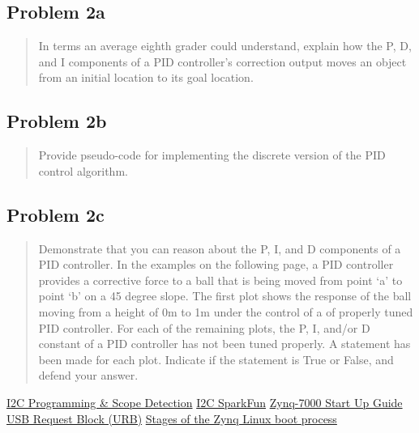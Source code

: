 \documentclass[10pt,a4paper]{article}
\let\oldsubsection\subsection
\renewcommand{\subsection}{%
    \setcounter{equation}{0}%
    \oldsubsection%
}
\begin{document}
\subsection{Problem 2a}\begin{quote}
In terms an average eighth grader could understand, explain how the P, D, and I components of a PID
controller’s correction output moves an object from an initial location to its goal location.\\
\end{quote}



\subsection{Problem 2b}\begin{quote}
Provide pseudo-code for implementing the discrete version of the PID control algorithm.
\end{quote}


\subsection{Problem 2c}\begin{quote}
Demonstrate that you can reason about the P, I, and D components of a PID controller. In the examples
on the following page, a PID controller provides a corrective force to a ball that is being moved from
point ‘a’ to point ‘b’ on a 45 degree slope. The first plot shows the response of the ball moving from a
height of 0m to 1m under the control of a of properly tuned PID controller. For each of the remaining
plots, the P, I, and/or D constant of a PID controller has not been tuned properly. A statement has been
made for each plot. Indicate if the statement is True or False, and defend your answer.
\end{quote}


\begin{thebibliography}{9}

\href{https://jeremyclark.ca/wp/telecom/i2c-programming-scope-detection/}{I2C Programming \& Scope Detection}
\href{https://learn.sparkfun.com/tutorials/i2c/all
}{I2C SparkFun}
\href{https://xilinx-wiki.atlassian.net/wiki/spaces/A/pages/189530183/Zynq-7000}{Zynq-7000 Start Up Guide}
\href{https://docs.kernel.org/driver-api/usb/URB.html
}{USB Request Block (URB)}
\href{https://tutorials.logictronix.com/our-resources/petalinux-development/stages-of-the-zynq-linux-boot-process/}{Stages of the Zynq Linux boot process}

\end{thebibliography}
\end{document}
